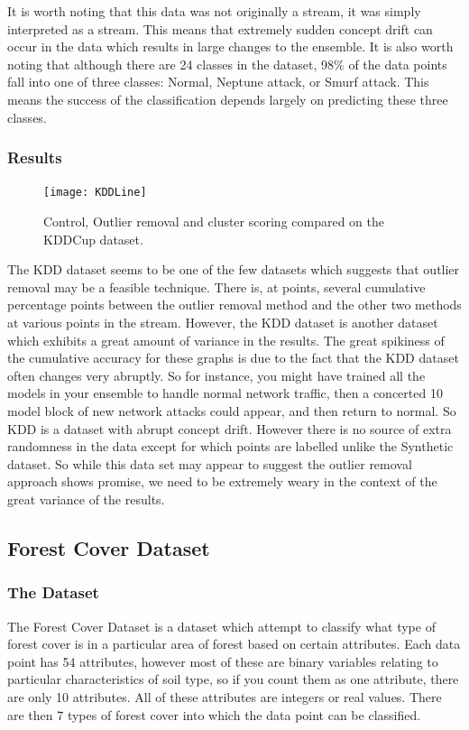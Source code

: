 \documentclass[12pt,a4paper,oneside]{report}
\begin{document}
It is worth noting that this data was not originally a stream, it was simply interpreted as a stream. This means that extremely sudden concept drift can occur in the data which results in large changes to the ensemble. It is also worth noting that although there are 24 classes in the dataset, 98\(\%\) of the data points fall into one of three classes: Normal, Neptune attack, or Smurf attack. This means the success of the classification depends largely on predicting these three classes. 
\subsubsection*{Results}

\begin{figure}
\texttt{[image: KDDLine]}
\caption{Control, Outlier removal and cluster scoring compared on the KDDCup dataset.}
\end{figure}

The KDD dataset seems to be one of the few datasets which suggests that outlier removal may be a feasible technique. There is, at points, several cumulative percentage points between the outlier removal method and the other two methods at various points in the stream. However, the KDD dataset is another dataset which exhibits a great amount of variance in the results. The great spikiness of the cumulative accuracy for these graphs is due to the fact that the KDD dataset often changes very abruptly. So for instance, you might have trained all the models in your ensemble to handle normal network traffic, then a concerted 10 model block of new network attacks could appear, and then return to normal. So KDD is a dataset with abrupt concept drift. However there is no source of extra randomness in the data except for which points are labelled unlike the Synthetic dataset. So while this data set may appear to suggest the outlier removal approach shows promise, we need to be extremely weary in the context of the great variance of the results.  
\subsection*{Forest Cover Dataset}
\subsubsection*{The Dataset}

The Forest Cover Dataset is a dataset which attempt to classify what type of forest cover is in a particular area of forest based on certain attributes. Each data point has 54 attributes, however most of these are binary variables relating to particular characteristics of soil type, so if you count them as one attribute, there are only 10 attributes. All of these attributes are integers or real values.  There are then 7 types of forest cover into which the data point can be classified. 
\end{document}
